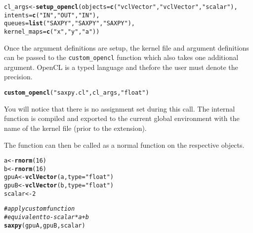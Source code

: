 \documentclass[12pt]{article}\usepackage[]{graphicx}\usepackage[]{color}
\makeatletter
\newcommand{\hlnum}[1]{\textcolor[rgb]{0.686,0.059,0.569}{#1}}%
\newcommand{\hlstr}[1]{\textcolor[rgb]{0.192,0.494,0.8}{#1}}%
\newcommand{\hlcom}[1]{\textcolor[rgb]{0.678,0.584,0.686}{\textit{#1}}}%
\newcommand{\hlstd}[1]{\textcolor[rgb]{0.345,0.345,0.345}{#1}}%
\newcommand{\hlkwb}[1]{\textcolor[rgb]{0.69,0.353,0.396}{#1}}%
\newcommand{\hlkwc}[1]{\textcolor[rgb]{0.333,0.667,0.333}{#1}}%
\newcommand{\hlkwd}[1]{\textcolor[rgb]{0.737,0.353,0.396}{\textbf{#1}}}%
\newenvironment{kframe}{%
 \def\at@end@of@kframe{}%
 \ifinner\ifhmode%
  \def\at@end@of@kframe{\end{minipage}}%
  \begin{minipage}{\columnwidth}%
 \fi\fi%
 \def\FrameCommand##1{\hskip\@totalleftmargin \hskip-\fboxsep
 \colorbox{shadecolor}{##1}\hskip-\fboxsep
     \hskip-\linewidth \hskip-\@totalleftmargin \hskip\columnwidth}%
 \MakeFramed {\advance\hsize-\width
   \@totalleftmargin\z@ \linewidth\hsize
   \@setminipage}}%
 {\par\unskip\endMakeFramed%
 \at@end@of@kframe}
\newenvironment{knitrout}{}{} %
\newcommand{\Rcode}[1]{\texttt{#1}}
\newcommand{\Rfunction}[1]{\Rcode{#1}}
\makeatother
\begin{document}
\begin{knitrout}
\color{fgcolor}\begin{kframe}
\begin{alltt}
\hlstd{cl_args} \hlkwb{<-} \hlkwd{setup_opencl}\hlstd{(}\hlkwc{objects} \hlstd{=} \hlkwd{c}\hlstd{(}\hlstr{"vclVector"}\hlstd{,} \hlstr{"vclVector"}\hlstd{,} \hlstr{"scalar"}\hlstd{),}
                        \hlkwc{intents} \hlstd{=} \hlkwd{c}\hlstd{(}\hlstr{"IN"}\hlstd{,} \hlstr{"OUT"}\hlstd{,} \hlstr{"IN"}\hlstd{),}
                        \hlkwc{queues} \hlstd{=} \hlkwd{list}\hlstd{(}\hlstr{"SAXPY"}\hlstd{,} \hlstr{"SAXPY"}\hlstd{,} \hlstr{"SAXPY"}\hlstd{),}
                        \hlkwc{kernel_maps} \hlstd{=} \hlkwd{c}\hlstd{(}\hlstr{"x"}\hlstd{,} \hlstr{"y"}\hlstd{,} \hlstr{"a"}\hlstd{))}
\end{alltt}
\end{kframe}
\end{knitrout}

Once the argument definitions are setup, the kernel file and argument definitions 
can be passed to the \Rfunction{custom\_opencl} function which also takes one additional 
argument.  OpenCL is a typed language and thefore the user must denote the precision.

\begin{knitrout}
\color{fgcolor}\begin{kframe}
\begin{alltt}
\hlkwd{custom_opencl}\hlstd{(}\hlstr{"saxpy.cl"}\hlstd{, cl_args,} \hlstr{"float"}\hlstd{)}
\end{alltt}
\end{kframe}
\end{knitrout}

You will notice that there is no assignment set during this call.  The internal
function is compiled and exported to the current global environment with the name
of the kernel file (prior to the extension).

The function can then be called as a normal function on the respective objects.

\begin{knitrout}
\color{fgcolor}\begin{kframe}
\begin{alltt}
\hlstd{a} \hlkwb{<-} \hlkwd{rnorm}\hlstd{(}\hlnum{16}\hlstd{)}
\hlstd{b} \hlkwb{<-} \hlkwd{rnorm}\hlstd{(}\hlnum{16}\hlstd{)}
\hlstd{gpuA} \hlkwb{<-} \hlkwd{vclVector}\hlstd{(a,} \hlkwc{type} \hlstd{=} \hlstr{"float"}\hlstd{)}
\hlstd{gpuB} \hlkwb{<-} \hlkwd{vclVector}\hlstd{(b,} \hlkwc{type} \hlstd{=} \hlstr{"float"}\hlstd{)}
\hlstd{scalar} \hlkwb{<-} \hlnum{2}

\hlcom{# apply custom function}
\hlcom{# equivalent to - scalar*a + b}
\hlkwd{saxpy}\hlstd{(gpuA, gpuB, scalar)}
\end{alltt}
\end{kframe}
\end{knitrout}
\end{document}
